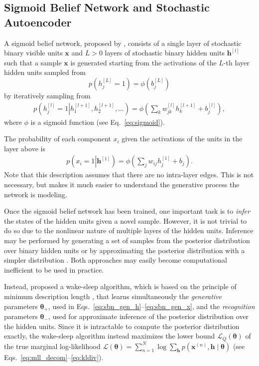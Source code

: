 \documentclass[dissertation,nocontribution]{aaltoseries}
\newcommand{\qlay}[1]{\left[#1\right]}
\newcommand{\vect}[1]{\mathbf{#1}}
\newcommand{\vects}[1]{\boldsymbol{#1}}
\newcommand{\vh}[0]{\vect{h}}
\newcommand{\vx}[0]{\vect{x}}
\newcommand{\TT}[0]{{\vects{\theta}}}
\newcommand{\LL}[0]{\mathcal{L}}
\begin{document}
\subsection{Sigmoid Belief Network and Stochastic Autoencoder}
\label{sec:sbn_dbn}

A sigmoid belief network, proposed by \citet{Neal1992},
consists of a single layer of stochastic binary visible
units $\vx$ and $L > 0$ layers of stochastic binary
hidden units $\vh^{\qlay{l}}$ such that a sample $\vx$ is
generated starting from the activations of the $L$-th layer
hidden units sampled from
\[
p\left(h_j^{\qlay{L}} = 1\right) = \phi\left( b_j^{\qlay{L}}
\right)
\]
by iteratively sampling from 
\begin{align}
    \label{eq:sbn_gen_h}
    p\left(h_j^{\qlay{l}} = 1 \left| h_1^{\qlay{l+1}},
    h_2^{\qlay{l+1}}, \dots
    \right.\right) = \phi\left( \sum_{k} w_{jk}^{\qlay{l}}
    h_k^{\qlay{l+1}} + b_j^{\qlay{l}}\right),
\end{align}
where $\phi$ is a sigmoid function (see
Eq.~\eqref{eq:sigmoid}). 

The probability of each component $x_i$ given the
activations of the units in the layer above is
\begin{align}
    \label{eq:sbn_gen_x}
    p\left(x_i = 1 \left| \vh^{\qlay{1}}
    \right.\right) = \phi\left( \sum_{j} w_{ij}
    h_j^{\qlay{1}} + b_j\right).
\end{align}
Note that this description assumes that there are no
intra-layer edges. This is not necessary, but makes it much
easier to understand the generative process the network is
modeling.

Once the sigmoid belief network has been trained, one important
task is to \textit{infer} the states of the hidden units given a
novel sample. However, it is not trivial to do so due to the
nonlinear nature of multiple layers of the hidden units.
Inference may be performed by generating a set of samples from
the posterior distribution over binary hidden units 
\citep{Neal1992} or by approximating the posterior distribution with a
simpler distribution \citep[see, e.g.,][]{Saul1996,Jordan1999}.
Both approaches may easily become computational inefficient to
be used in practice. 

Instead, \citet{Hinton1995} proposed a wake-sleep algorithm, which is
based on the principle of minimum description length
\citep{Rissanen1978},
that learns simultaneously the \textit{generative}
parameters $\TT_+$, used in
Eqs.~\eqref{eq:sbn_gen_h}--\eqref{eq:sbn_gen_x}, and the
\textit{recognition} parameters $\TT_-$, used for
approximate inference of the posterior distribution over the
hidden units. Since it is intractable to compute the
posterior distribution exactly, the wake-sleep algorithm
instead maximizes the lower bound $\LL_Q(\TT)$ of the true
marginal log-likelihood $\LL(\TT) = \sum_{n=1}^N \log
\sum_{\vh} p(\vx^{(n)}, \vh \mid \TT)$ (see
Eqs.~\eqref{eq:mll_decom}--\eqref{eq:kldiv}).
\end{document}
